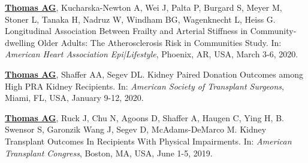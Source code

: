 \documentclass[10pt]{article}
\makeatletter
\newlength{\bibhang}
\newlength{\bibsep}
 {\@listi \global\bibsep\itemsep \global\advance\bibsep by\parsep}
\newenvironment{bibenum*}
  {\renewcommand\labelenumi{[\theenumi]}%
   \etaremune[
     topsep=0pt,
     itemsep=\bibsep,
     parsep=0pt,partopsep=0pt,
     itemindent=-\bibhang,
     leftmargin={\bibhang+\widthof{[999]}}]}
  {\endetaremune}
\makeatother
\begin{document}
\begin{bibenum*}

\item \underline{\textbf{Thomas AG}}, Kucharska-Newton A, Wei J,
  Palta P, Burgard S, Meyer M, Stoner L, Tanaka H, Nadruz W,
  Windham BG, Wagenknecht L, Heiss G.
  Longitudinal Association Between Frailty and Arterial Stiffness
  in Community-dwelling Older Adults: The Atherosclerosis Risk in
  Communities Study.
  In: \emph{American Heart Association Epi|Lifestyle},
  Phoenix, AR, USA, March 3-6, 2020.

\item \underline{\textbf{Thomas AG}}, Shaffer AA, Segev DL.
  Kidney Paired Donation Outcomes among High PRA Kidney Recipients.
  In: \emph{American Society of Transplant Surgeons},
  Miami, FL, USA, January 9-12, 2020.





\item \underline{\textbf{Thomas AG}}, Ruck J, Chu N, Agoons D, Shaffer A,
  Haugen C, Ying H, B. Swensor S, Garonzik Wang J, Segev D, McAdams-DeMarco M.
  Kidney Transplant Outcomes In Recipients With Physical Impairments.
  In: \emph{American Transplant Congress},
  Boston, MA, USA, June 1-5, 2019.


\end{bibenum*}
\end{document}
